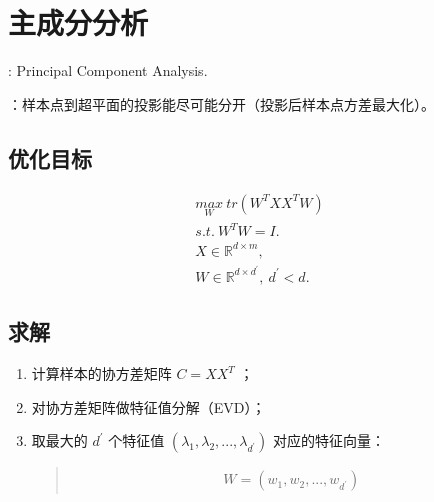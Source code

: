 \documentclass[letterpaper,10pt,english]{sphinxmanual}
\begin{document}
\section{主成分分析}
\label{\detokenize{machineLearning/03_pca::doc}}\label{\detokenize{machineLearning/03_pca:id1}}
 : Principal Component Analysis.

 ：样本点到超平面的投影能尽可能分开（投影后样本点方差最大化）。


\subsection{优化目标}
\label{\detokenize{machineLearning/03_pca:id2}}\begin{equation*}
\begin{split}\underset{W}{max} \ tr(W^TXX^TW) \\
s.t. \ W^TW=I. \\
X \in \mathbb{R}^{d \times m}, \\
W \in \mathbb{R}^{d \times d^\prime}, \ d^\prime < d.\end{split}
\end{equation*}

\subsection{求解}
\label{\detokenize{machineLearning/03_pca:id3}}\begin{enumerate}
\item {} 
计算样本的协方差矩阵 \(C = XX^T\) ；

\item {} 
对协方差矩阵做特征值分解（EVD）；

\item {} 
取最大的 \(d^\prime\) 个特征值 \((\lambda_1, \lambda_2,...,\lambda_{d^\prime})\) 对应的特征向量：
\begin{quote}
\begin{equation*}
\begin{split}W = (w_1, w_2,...,w_{d^\prime})\end{split}
\end{equation*}\end{quote}

\end{enumerate}
\end{document}
